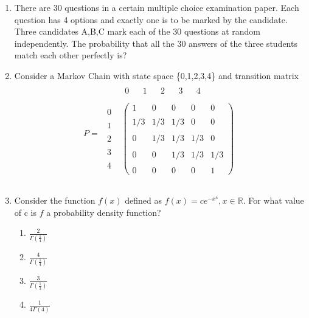 \documentclass[journal,12pt,twocolumn]{IEEEtran}
\begin{document}
\begin{enumerate}[label=\arabic*.,ref=\theenumi]
\item There are 30 questions in a certain multiple choice examination paper. Each question has 4 options and exactly one is to be marked by the candidate. Three candidates A,B,C mark each of the 30 questions at random independently. The probability that all the 30 answers of the three students match each other perfectly is?

%
\item Consider a Markov Chain with state space  \{0,1,2,3,4\} and transition matrix
\begin{align}
P=\begin{matrix} & \begin{matrix}0&&1&&2&&3 && 4\end{matrix} \\\\ \begin{matrix}0\\\\1\\\\2\\\\3\\\\4\end{matrix} & \begin{pmatrix} 1 & 0 & 0 & 0 & 0 \\\\  1 / 3 & 1 / 3 & 1 / 3 & 0 & 0 \\\\  0 & 1 / 3 & 1 / 3 & 1 / 3 & 0 \\\\ 0 & 0 & 1 / 3 & 1 / 3 & 1 / 3 \\\\  0 & 0 & 0 & 0 & 1\end{pmatrix}\\\\ \end{matrix}  \nonumber
\end{align}

\item Consider the function $ f(x) $ defined as $ f(x) = c e^{-x^{4}}, x\in \mathbb{R}$. For what value of c is $f$ a probability density function?
\begin{enumerate}
\item $\frac{2}{\Gamma (\frac{1}{4})}$
\item $\frac{4}{\Gamma (\frac{1}{4})}$
\item $\frac{3}{\Gamma (\frac{1}{3})}$
\item $\frac{1}{4\Gamma(4) }$
\end{enumerate}



\end{enumerate}
\end{document}
